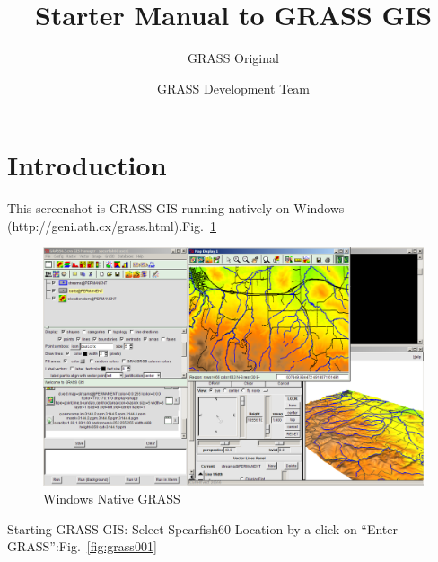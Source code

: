 %


\title{Starter Manual to GRASS GIS}
\subtitle{GRASS Original}
\author{GRASS Development Team}

\maketitle

\section{Introduction}

This screenshot is GRASS GIS running natively on Windows
(http://geni.ath.cx/grass.html).Fig.~\ref{fig:grass000}
\begin{figure}[htbp]
   \centering
   \includegraphics[scale=0.15]{grass000.png}
   \caption{Windows Native GRASS}
   \label{fig:grass000}
\end{figure}

Starting GRASS GIS: Select Spearfish60 Location by a click on
``Enter GRASS'':Fig.~\ref{fig:grass001}

